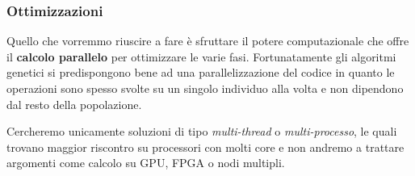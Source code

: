 \subsubsection{Ottimizzazioni}

Quello che vorremmo riuscire a fare è sfruttare il potere computazionale che
offre il \textbf{calcolo parallelo} per ottimizzare le varie fasi.
Fortunatamente gli algoritmi genetici si predispongono bene ad una
parallelizzazione del codice in quanto le operazioni sono spesso svolte su
un singolo individuo alla volta e non dipendono dal resto della popolazione.

Cercheremo unicamente soluzioni di tipo \emph{multi-thread} o
\emph{multi-processo}, le quali trovano maggior riscontro su processori con
molti core e non andremo a trattare argomenti come calcolo su GPU, FPGA o
nodi multipli.